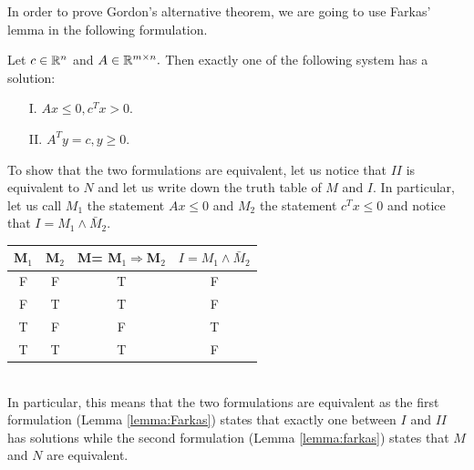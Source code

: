 \documentclass[10pt,a4paper]{article}
\begin{document}
\noindent In order to prove Gordon's alternative theorem, we are going to use Farkas' lemma in the following formulation.
\begin{lemma}\label{lemma:Farkas}
	Let $c\in \mathbb{R}^n$ and $A\in \mathbb{R}^{m\times n}.$ Then exactly one of the following system has a solution:
	\begin{itemize}
		\item[I.] $Ax\leq 0, c^Tx> 0$. 
		\item[II.] $A^Ty=c, y\geq 0$.
	\end{itemize}
\end{lemma}
\noindent To show that the two formulations are equivalent, let us notice that $II$ is equivalent to $N$ and let us write down the truth table of $M$ and $I$. In particular, let us call $M_1$ the statement $Ax\leq 0$ and $M_2$ the statement $c^Tx\leq0$ and notice that $I=M_1 \wedge \bar{M}_2$.\\

\begin{tabular}{|c|c|c|c|}
	\hline
	M$_1$& M$_2$ & M= M$_1\Rightarrow$M$_2$& $I=M_1 \wedge \bar{M}_2$ \\
	\hline
	F& F & T & F \\
	\hline
	F& T & T & F \\
	\hline
	T& F & F & T \\
	\hline
	T& T & T & F \\
	\hline
\end{tabular}\\[1\baselineskip]
In particular, this means that the two formulations are equivalent as the first formulation (Lemma \ref{lemma:Farkas}) states that exactly one between $I$ and $II$ has solutions while the second formulation (Lemma \ref{lemma:farkas}) states that $M$ and $N$ are equivalent.
\end{document}
